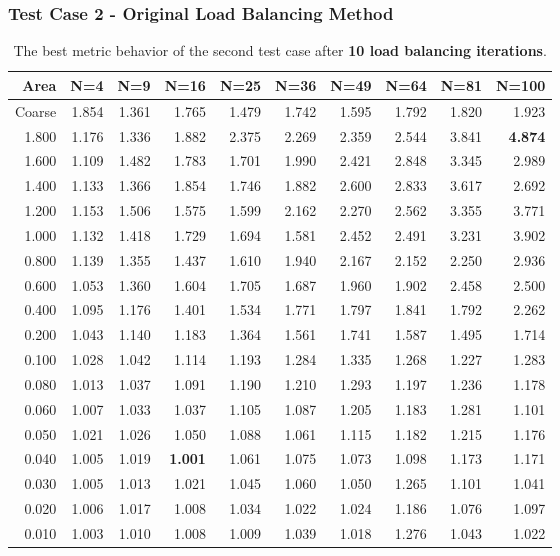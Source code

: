 \documentclass[compress]{beamer}
\begin{document}
\begin{frame}[t]\frametitle{Test Case 2 - Original Load Balancing Method}
\begin{table}[H]
\centering
\tiny
\caption{The best metric behavior of the second test case after \textbf{10 load balancing iterations}.} 
\begin{tabular}{rrrrrrrrrr}
 \hline
 Area & N=4 & N=9 & N=16 & N=25 & N=36 & N=49 & N=64 & N=81 & N=100 \\ 
\hline
 Coarse & 1.854 & 1.361 & 1.765 & 1.479 & 1.742 & 1.595 & 1.792 & 1.820 & 1.923 \\
  1.800 & 1.176 & 1.336 & 1.882 & 2.375 & 2.269 & 2.359 & 2.544 & 3.841 & \textbf{\cellcolor{blue!25}4.874} \\
  1.600 & 1.109 & 1.482 & 1.783 & 1.701 & 1.990 & 2.421 & 2.848 & 3.345 & 2.989 \\
  1.400 & 1.133 & 1.366 & 1.854 & 1.746 & 1.882 & 2.600 & 2.833 & 3.617 & 2.692 \\
  1.200 & 1.153 & 1.506 & 1.575 & 1.599 & 2.162 & 2.270 & 2.562 & 3.355 & 3.771 \\
  1.000 & 1.132 & 1.418 & 1.729 & 1.694 & 1.581 & 2.452 & 2.491 & 3.231 & 3.902 \\
  0.800 & 1.139 & 1.355 & 1.437 & 1.610 & 1.940 & 2.167 & 2.152 & 2.250 & 2.936 \\
  0.600 & 1.053 & 1.360 & 1.604 & 1.705 & 1.687 & 1.960 & 1.902 & 2.458 & 2.500 \\
  0.400 & 1.095 & 1.176 & 1.401 & 1.534 & 1.771 & 1.797 & 1.841 & 1.792 & 2.262 \\
  0.200 & 1.043 & 1.140 & 1.183 & 1.364 & 1.561 & 1.741 & 1.587 & 1.495 & 1.714 \\
  0.100 & 1.028 & 1.042 & 1.114 & 1.193 & 1.284 & 1.335 & 1.268 & 1.227 & 1.283 \\
  0.080 & 1.013 & 1.037 & 1.091 & 1.190 & 1.210 & 1.293 & 1.197 & 1.236 & 1.178 \\
  0.060 & 1.007 & 1.033 & 1.037 & 1.105 & 1.087 & 1.205 & 1.183 & 1.281 & 1.101 \\
  0.050 & 1.021 & 1.026 & 1.050 & 1.088 & 1.061 & 1.115 & 1.182 & 1.215 & 1.176 \\
  0.040 & 1.005 & 1.019 & \textbf{\cellcolor{blue!25}1.001} & 1.061 & 1.075 & 1.073 & 1.098 & 1.173 & 1.171 \\
  0.030 & 1.005 & 1.013 & 1.021 & 1.045 & 1.060 & 1.050 & 1.265 & 1.101 & 1.041 \\
  0.020 & 1.006 & 1.017 & 1.008 & 1.034 & 1.022 & 1.024 & 1.186 & 1.076 & 1.097 \\
  0.010 & 1.003 & 1.010 & 1.008 & 1.009 & 1.039 & 1.018 & 1.276 & 1.043 & 1.022 \\
\hline
\end{tabular}
\end{table}
\end{frame}
\end{document}
